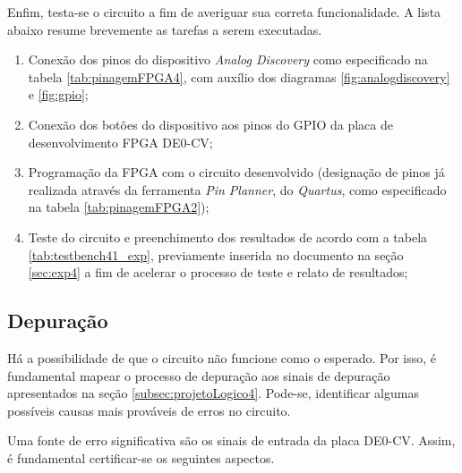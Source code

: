\documentclass[amsmath,amssymb,floatfix]{report}
\begin{document}
Enfim, testa-se o circuito a fim de averiguar sua correta funcionalidade. A lista abaixo resume brevemente as tarefas a serem executadas.

\begin{enumerate}
    \item Conexão dos pinos do dispositivo \textit{Analog Discovery} como especificado na tabela \ref{tab:pinagemFPGA4}, com auxílio dos diagramas \ref{fig:analogdiscovery} e \ref{fig:gpio};
    \item Conexão dos botões do dispositivo aos pinos do GPIO da placa de desenvolvimento FPGA DE0-CV;
    \item Programação da FPGA com o circuito desenvolvido (designação de pinos já realizada através da ferramenta \textit{Pin Planner}, do \textit{Quartus}, como especificado na tabela \ref{tab:pinagemFPGA2});
    \item Teste do circuito e preenchimento dos resultados de acordo com a tabela \ref{tab:testbench41_exp}, previamente inserida no documento na seção \ref{sec:exp4} a fim de acelerar o processo de teste e relato de resultados;
\end{enumerate}

\subsection{Depuração}
\label{subsec:depuracao4}

Há a possibilidade de que o circuito não funcione como o esperado. Por isso, é fundamental mapear o processo de depuração aos sinais de depuração apresentados na seção \ref{subsec:projetoLogico4}. Pode-se, identificar algumas possíveis causas mais prováveis de erros no circuito. 

Uma fonte de erro significativa são os sinais de entrada da placa DE0-CV. Assim, é fundamental certificar-se os seguintes aspectos.
\end{document}
